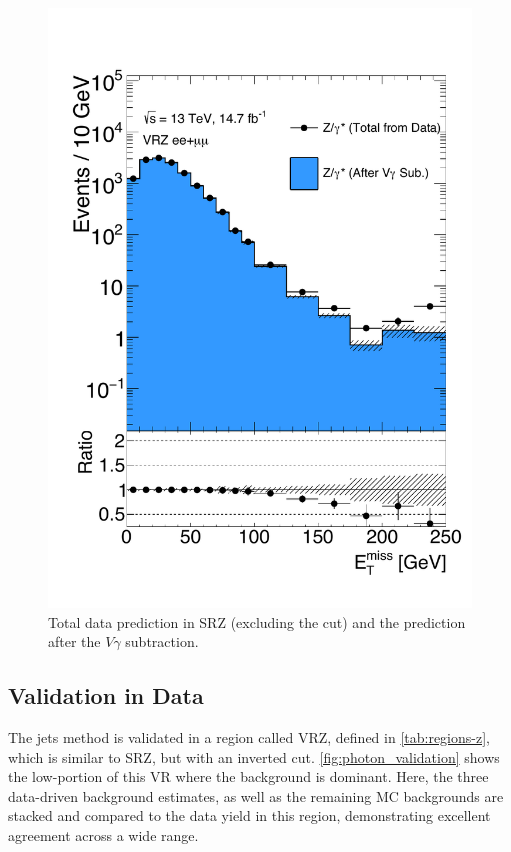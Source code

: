 \begin{centering}
\begin{figure}[!hbt]
\myfloatalign
\includegraphics[width=.90\linewidth]{figures/photons/Vgamma_MET_ee+mm_zmet_onz.pdf}
\caption{Total \gjets data prediction in SRZ (excluding the \met cut) and the prediction after the $V\gamma$ subtraction.}
\label{fig:photon_vgamma_subt}
\end{figure}
\end{centering}

\subsection{Validation in Data}

The \gjets jets method is validated in a region called VRZ, defined in \autoref{tab:regions-z}, which is similar to SRZ, but with an inverted \met cut. \autoref{fig:photon_validation} shows the low-\met portion of this \ac{VR} where the \dyjets background is dominant. Here, the three data-driven background estimates, as well as the remaining \ac{MC} backgrounds are stacked and compared to the data yield in this region, demonstrating excellent agreement across a wide \met range. 

